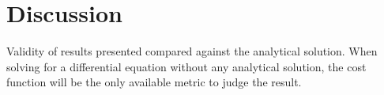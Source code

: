 \section{Discussion}



Validity of results presented compared against the analytical solution. When solving for a differential equation without any analytical solution, the cost function will be the only available metric to judge the result.